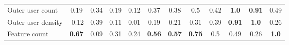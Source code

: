 \begin{tabularx}{\textwidth}{lCCCCCCCCCCC}
Outer user count    &           0.19 &             0.34 &                0.19 &           0.12 &              0.37 &           0.38 &              0.5 &               0.42 &     \textbf{1.0} &      \textbf{0.91} &           0.49 \\
Outer user density  &          -0.12 &             0.39 &                0.11 &           0.01 &              0.19 &           0.21 &             0.31 &               0.39 &    \textbf{0.91} &       \textbf{1.0} &           0.26 \\
Feature count       &  \textbf{0.67} &             0.09 &                0.31 &           0.24 &     \textbf{0.56} &  \textbf{0.57} &    \textbf{0.75} &                0.5 &             0.49 &               0.26 &   \textbf{1.0} \\
\bottomrule
\end{tabularx}
